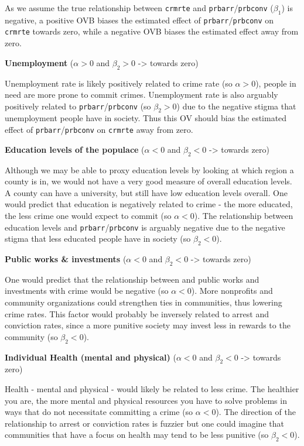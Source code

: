 \documentclass[]{article}
\begin{document}
As we assume the true relationship between \texttt{crmrte} and
\texttt{prbarr}/\texttt{prbconv} (\(\beta_1\)) is negative, a positive
OVB biases the estimated effect of \texttt{prbarr}/\texttt{prbconv} on
\texttt{crmrte} towards zero, while a negative OVB biases the estimated
effect away from zero.

\textbf{Unemployment} (\(\alpha > 0\) and \(\beta_2 > 0\)
-\textgreater{} towards zero)

Unemployment rate is likely positively related to crime rate (so
\(\alpha > 0\)), people in need are more prone to commit crimes.
Unemployment rate is also arguably positively related to
\texttt{prbarr}/\texttt{prbconv} (so \(\beta_2 > 0\)) due to the
negative stigma that unemployment people have in society. Thus this OV
should bias the estimated effect of \texttt{prbarr}/\texttt{prbconv} on
\texttt{crmrte} away from zero.

\textbf{Education levels of the populace} (\(\alpha < 0\) and
\(\beta_2 < 0\) -\textgreater{} towards zero)

Although we may be able to proxy education levels by looking at which
region a county is in, we would not have a very good measure of overall
education levels. A county can have a university, but still have low
education levels overall. One would predict that education is negatively
related to crime - the more educated, the less crime one would expect to
commit (so \(\alpha < 0\)). The relationship between education levels
and \texttt{prbarr}/\texttt{prbconv} is arguably negative due to the
negative stigma that less educated people have in society (so
\(\beta_2 < 0\)).

\textbf{Public works \& investments} (\(\alpha < 0\) and \(\beta_2 < 0\)
-\textgreater{} towards zero)

One would predict that the relationship between and public works and
investments with crime would be negative (so \(\alpha < 0\)). More
nonprofits and community organizations could strengthen ties in
communities, thus lowering crime rates. This factor would probably be
inversely related to arrest and conviction rates, since a more punitive
society may invest less in rewards to the community (so
\(\beta_2 < 0\)).

\textbf{Individual Health (mental and physical)} (\(\alpha < 0\) and
\(\beta_2 < 0\) -\textgreater{} towards zero)

Health - mental and physical - would likely be related to less crime.
The healthier you are, the more mental and physical resources you have
to solve problems in ways that do not necessitate committing a crime (so
\(\alpha < 0\)). The direction of the relationship to arrest or
conviction rates is fuzzier but one could imagine that communities that
have a focus on health may tend to be less punitive (so
\(\beta_2 < 0\)).
\end{document}
